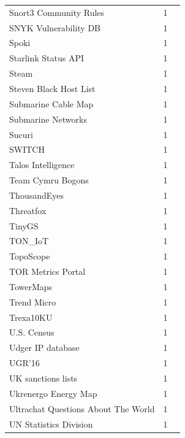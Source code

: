 \documentclass[11pt,a4paper]{article}
\begin{document}
\begin{longtable}{@{}p{} p{}p{}@{}}
Snort3 Community Rules & 1 & \cite{10.1007/978-3-031-56252-5_15} \\
SNYK Vulnerability DB & 1 & \cite{10.1145/3618257.3624804} \\
Spoki & 1 & \cite{10.1145/3777912.3839790} \\
Starlink Status API & 1 & \cite{10.1145/3517745.3561457} \\
Steam & 1 & \cite{10.1007/978-3-031-56249-5_2} \\
Steven Black Host List & 1 & \cite{10.1145/3618257.3624842} \\
Submarine Cable Map & 1 & \cite{10.1145/3777912.3839834} \\
Submarine Networks & 1 & \cite{10.1145/3777912.3839834} \\
Sucuri & 1 & \cite{10.1145/3777912.3839795} \\
SWITCH & 1 & \cite{10.1145/3618257.3624797} \\
Talos Intelligence & 1 & \cite{10.1145/3777912.3839796} \\
Team Cymru Bogons & 1 & \cite{10.1007/978-3-032-18268-5_2} \\
ThousandEyes & 1 & \cite{10.1007/978-3-031-85960-1_14} \\
Threatfox & 1 & \cite{10.1007/978-3-031-56249-5_9} \\
TinyGS & 1 & \cite{10.1145/3730567.3764496} \\
TON\_IoT & 1 & \cite{10.1145/3646547.3689011} \\
TopoScope & 1 & \cite{10.1145/3487552.3487825} \\
TOR Metrics Portal & 1 & \cite{10.1007/978-3-030-72582-2_28} \\
TowerMaps & 1 & \cite{10.1007/978-3-031-85960-1_20} \\
Trend Micro & 1 & \cite{10.1145/3777912.3839797} \\
Trexa10KU & 1 & \cite{10.1145/3517745.3561444} \\
U.S. Census & 1 & \cite{10.1145/3517745.3561460} \\
Udger IP database & 1 & \cite{10.1145/3618257.3624797} \\
UGR'16 & 1 & \cite{10.1145/3646547.3689011} \\
UK sanctions lists & 1 & \cite{10.1145/3517745.3561423} \\
Ukrenergo Energy Map & 1 & \cite{10.1145/3730567.3764449} \\
Ultrachat Questions About The World & 1 & \cite{10.1145/3777912.3839824} \\
UN Statistics Division & 1 & \cite{10.1145/3777912.3839787} \\

\end{longtable}
\end{document}
